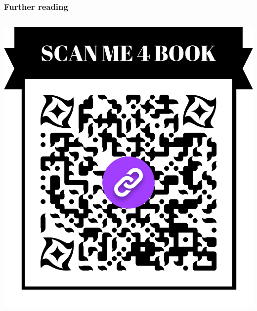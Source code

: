 \documentclass{beamer}
\begin{document}
% 



\begin{frame}
\frametitle{Further reading}
\begin{columns}[c] %
\includegraphics[width=\linewidth]{QR_Book}

\end{columns}
\end{frame}
\end{document}

